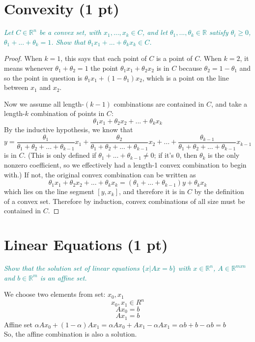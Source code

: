 \documentclass[onecolumn]{article}
\begin{document}
\section{Convexity (1 pt)}

\textcolor{teal}{\emph{Let $C \in \mathbb{R}^n $ be a convex set, with $x_1,...,x_k \in C$, and let $\theta_1,...,\theta_k \in \mathbb{R}$ satisfy $\theta_i \ge 0$, $\theta_1 + ... + \theta_k = 1$. Show that $\theta_1 x_1 + ... + \theta_k x_k \in C$.}}
\begin{proof}
When $k=1$, this says that each point of $C$ is a point of $C$. When $k=2$, it means whenever $\theta_1 + \theta_2 = 1$ the point $\theta_1 x_1 + \theta_2 x_2$ is in $C$ because $\theta_2 = 1 - \theta_1$ and so the point in question is $\theta_1 x_1 + (1-\theta_1) x_2$, which is a point on the line between $x_1$ and $x_2$. 

Now we assume all length-$(k-1)$ combinations are contained in $C$, and take a length-$k$ combination of points in $C$:
\[\theta_1 x_1 + \theta_2 x_2 + ... + \theta_k x_k\]
By the inductive hypothesis, we know that 
\[ y = \frac{\theta_1}{\theta_1 + \theta_2 + ... + \theta_{k-1}} x_1 + \frac{\theta_2}{\theta_1 + \theta_2 + ... + \theta_{k-1}} x_2 + ... + \frac{\theta_{k-1}}{\theta_1 + \theta_2 + ... + \theta_{k-1}} x_{k-1}\]
is in $C$. (This is only defined if $\theta_1 + ... + \theta_{k-1} \neq 0$; if it's $0$, then $\theta_k$ is the only nonzero coefficient, so we effectively had a length-1 convex combination to begin with.) If not, the original convex combination can be written as 
\[\theta_1 x_1 + \theta_2 x_2 + ... + \theta_k x_k = (\theta_1 + ... + \theta_{k-1})y + \theta_k x_k\]
which lies on the line segment $[y,x_k]$, and therefore it is in $C$ by the definition of a convex set. Therefore by induction, convex combinations of all size must be contained in $C$.

\end{proof}


\section{Linear Equations (1 pt)}
\textcolor{teal}{\emph{Show that the solution set of linear equations $\{x | Ax = b\}$ with $x \in \mathbb{R}^n$, $A \in \mathbb{R}^{mxn}$ and $b \in \mathbb{R}^m$ is an affine set.}}

We choose two elements from set:  $x_0, x_1$ 
\[x_0 , x_1 \in R^n\]
\[A x_0 = b\]
\[A x_1 = b\]
Affine set \textrightarrow \; $\alpha A x_0 + (1-\alpha) A x_1= \alpha A x_0 +A x_1-\alpha A x_1 = \alpha b + b - \alpha b = b$ 
\\
So, the affine combination is also a solution.
\end{document}
